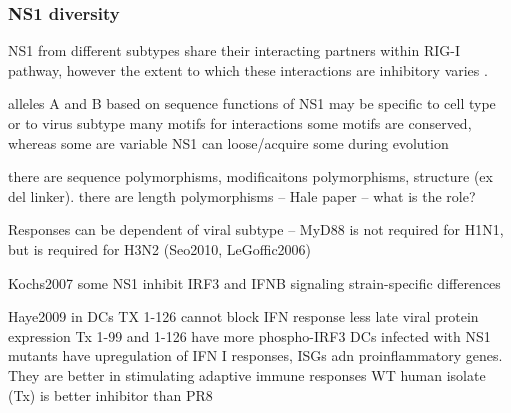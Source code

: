 		
		\subsubsection{NS1 diversity}
		
		NS1 from different subtypes share their interacting partners within \gls{RIG-I} pathway, however the extent to which these interactions are inhibitory varies \parencite{Kochs2007, Haye2009, Munir2011a, Munir2012}.
		
		alleles A and B based on sequence
		functions of NS1 may be specific to cell type or to virus subtype
		many motifs for interactions 
		some motifs are conserved, whereas some are variable
		NS1 can loose/acquire some during evolution
		
		there are sequence polymorphisms, modificaitons polymorphisms, structure (ex del linker). there are length polymorphisms -- Hale paper -- what is the role?
		
		Responses can be dependent of viral subtype -- MyD88 is not required for H1N1, but is required for H3N2 (Seo2010, LeGoffic2006)
		
		Kochs2007
		some NS1 inhibit IRF3 and IFNB signaling
		strain-specific differences
		
		Haye2009
		in DCs
		TX 1-126 cannot block IFN response
		less late viral protein expression
		Tx 1-99 and 1-126 have more phospho-IRF3
		DCs infected with NS1 mutants have upregulation of IFN I responses, ISGs adn proinflammatory genes. They are better in stimulating adaptive immune responses
		WT human isolate (Tx) is better inhibitor than PR8
				
		
		
		
